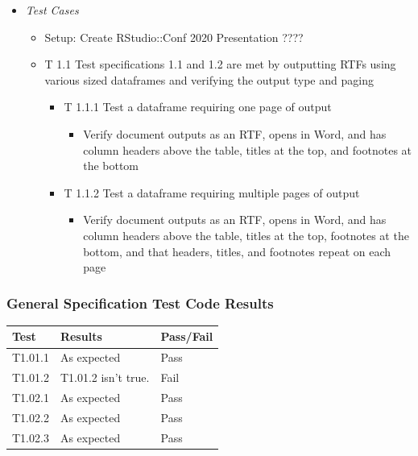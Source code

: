 \documentclass[]{article}
\providecommand{\tightlist}{%
  \setlength{\itemsep}{0pt}\setlength{\parskip}{0pt}}
\begin{document}
\begin{itemize}
\item
  \emph{Test Cases}

  \begin{itemize}
  \item
    Setup: Create RStudio::Conf 2020 Presentation ????
  \item
    T 1.1 Test specifications 1.1 and 1.2 are met by outputting RTFs
    using various sized dataframes and verifying the output type and
    paging

    \begin{itemize}
    \tightlist
    \item
      T 1.1.1 Test a dataframe requiring one page of output

      \begin{itemize}
      \tightlist
      \item
        Verify document outputs as an RTF, opens in Word, and has column
        headers above the table, titles at the top, and footnotes at the
        bottom
      \end{itemize}
    \item
      T 1.1.2 Test a dataframe requiring multiple pages of output

      \begin{itemize}
      \tightlist
      \item
        Verify document outputs as an RTF, opens in Word, and has column
        headers above the table, titles at the top, footnotes at the
        bottom, and that headers, titles, and footnotes repeat on each
        page
      \end{itemize}
    \end{itemize}
  \end{itemize}
\end{itemize}

\hypertarget{general-specification-test-code-results}{%
\subsubsection{General Specification Test Code
Results}\label{general-specification-test-code-results}}

\begin{table}[H]
\centering
\begin{tabular}{l|l|l}
\hline
Test & Results & Pass/Fail\\
\hline
T1.01.1 & As expected & Pass\\
\hline
T1.01.2 & T1.01.2 isn't true. & Fail\\
\hline
T1.02.1 & As expected & Pass\\
\hline
T1.02.2 & As expected & Pass\\
\hline
T1.02.3 & As expected & Pass\\
\hline
\end{tabular}
\end{table}
\end{document}
